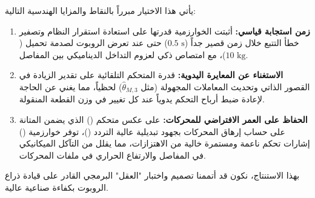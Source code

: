 يأتي هذا الاختيار مبرراً بالنقاط والمزايا الهندسية التالية:
\begin{enumerate}
    \item \textbf{زمن استجابة قياسي:} أثبتت الخوارزمية قدرتها على استعادة استقرار النظام وتصفير خطأ التتبع خلال زمن قصير جداً ($0.5 \text{ s}$) حتى عند تعرض الروبوت  لصدمة تحميل ($10 \text{ kg}$)، مع امتصاص ذكي لعزوم التداخل الديناميكي بين المفاصل.
    \item \textbf{الاستغناء عن المعايرة اليدوية:} قدرة المتحكم التلقائية على تقدير الزيادة في القصور الذاتي وتحديث المعاملات المجهولة (مثل $\hat{\theta}_{M,3}$) لحظياً، مما يغني عن الحاجة لإعادة ضبط أرباح التحكم يدوياً عند كل تغيير في وزن القطعة المنقولة.
    \item \textbf{الحفاظ على العمر الافتراضي للمحركات:} على عكس متحكم () الذي يضمن المتانة على حساب إرهاق المحركات بجهود تبديلية عالية التردد ()، توفر خوارزمية () إشارات تحكم ناعمة ومستمرة خالية من الاهتزازات، مما يقلل من التآكل الميكانيكي في المفاصل والارتفاع الحراري في ملفات المحركات.
\end{enumerate}

بهذا الاستنتاج، نكون قد أتممنا تصميم واختبار "العقل" البرمجي القادر على قيادة ذراع الروبوت بكفاءة صناعية عالية.